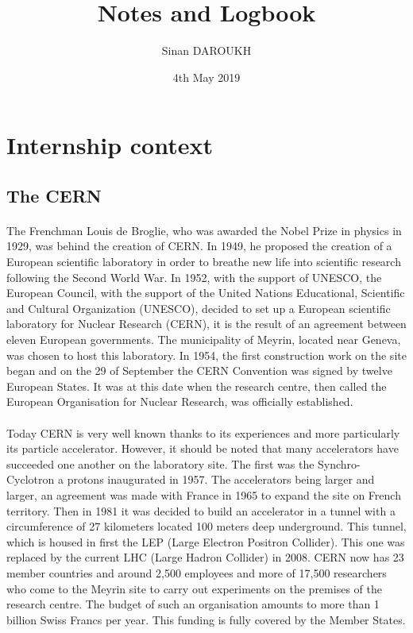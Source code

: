 \documentclass[a4paper, 10pt]{article}
\title{Notes and Logbook}
\author{Sinan DAROUKH}
\date{4th May 2019}
\begin{document}
\begin{titlepage}
\maketitle
\end{titlepage}

\tableofcontents
\newpage

\section{Internship context}
\subsection{The CERN}
\paragraph{}
The Frenchman Louis de Broglie, who was awarded the Nobel Prize in physics in 1929, was behind the creation of CERN. 
In 1949, he proposed the creation of a European scientific laboratory in order to breathe new life into scientific research following the Second World War. 
In 1952, with the support of UNESCO, the European Council, with the support of the United Nations Educational, Scientific and Cultural Organization (UNESCO), decided to set up a European scientific laboratory for Nuclear Research (CERN), it is the result of an agreement between eleven European governments. 
The municipality of Meyrin, located near Geneva, was chosen to host this laboratory.
In 1954, the first construction work on the site began and on the 29 of September the CERN Convention was signed by twelve European States. 
It was at this date when the research centre, then called the European Organisation for Nuclear Research, was officially established.
\paragraph{}
Today CERN is very well known thanks to its experiences and more particularly its particle accelerator. 
However, it should be noted that many accelerators have succeeded one another on the laboratory site. 
The first was the Synchro-Cyclotron a protons inaugurated in 1957. The accelerators being larger and larger, an agreement was made with France in 1965 to expand the site on French territory. 
Then in 1981 it was decided to build an accelerator in a tunnel with a circumference of 27 kilometers located 100 meters deep underground. 
This tunnel, which is housed in first the LEP (Large Electron Positron Collider). This one was replaced by the current LHC (Large Hadron Collider) in 2008. 
CERN now has 23 member countries and around 2,500 employees and more of 17,500 researchers who come to the Meyrin site to carry out experiments on the premises of the research centre. 
The budget of such an organisation amounts to more than 1 billion Swiss Francs per year.
This funding is fully covered by the Member States.
\end{document}
